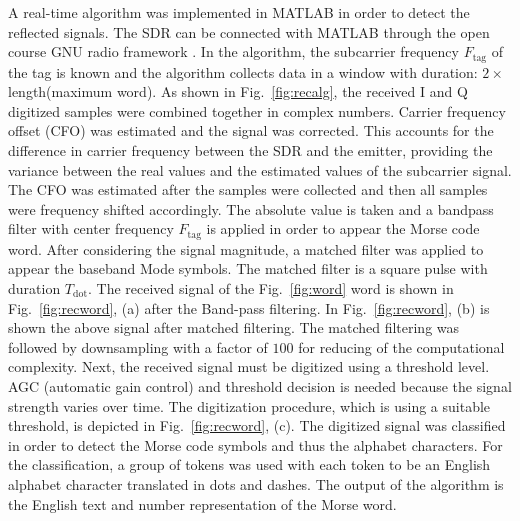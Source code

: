 \documentclass[journal]{IEEEtran}
\begin{document}
A real-time algorithm was implemented in MATLAB in order to detect the reflected signals.
%
The SDR can be connected with MATLAB through the open course GNU radio framework  \cite{radio2007gnu}. 
%
In the algorithm, the subcarrier frequency  $F_\text{tag}$   of the tag is known and the algorithm  collects   data in a window with duration: $2 \times$length(maximum word).
%
As shown in Fig.~\ref{fig:recalg}, the received I and Q digitized 
samples  were combined together in  complex numbers.
%
Carrier frequency offset  (CFO) was estimated and 
the signal was corrected.
%
This accounts for the difference in carrier frequency between the SDR and the emitter, providing the  variance between the real values and the estimated values of the subcarrier signal.
%
The  CFO was estimated after the samples were collected and then all samples were frequency shifted accordingly.
%
The absolute value  is taken and  a bandpass  filter with center frequency $F_\text{tag}$ is  applied  in order to appear the Morse code word.
%
After considering the signal magnitude, a matched filter was  applied to appear the baseband Mode symbols.
%
The matched filter is  a square pulse with duration $T_\text{dot}$.
%
The received  signal  of the Fig.~\ref{fig:word}  word is shown  in Fig.~\ref{fig:recword}, (a) after the Band-pass filtering.
%
In  Fig.~\ref{fig:recword}, (b) is shown the  above signal  after matched filtering.
%
The matched filtering was followed by downsampling with a factor of $100$
for reducing of the computational complexity.
%
Next, the received signal must be digitized using a threshold level.
%
AGC  (automatic gain control) and threshold decision is needed because the signal strength varies  over time. 
%
The digitization  procedure, which is using a  suitable threshold, is depicted in Fig.~\ref{fig:recword}, (c).
%
The digitized signal was classified in order to detect the Morse code symbols and thus the alphabet characters.
% 
For the classification, a group of tokens was used with each token to be an
English alphabet character translated in dots and dashes.
%
The output of the algorithm is the English text and number representation of the Morse word.
\end{document}
